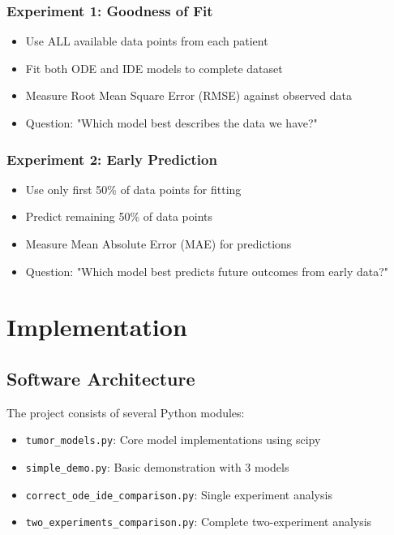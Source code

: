 \documentclass[11pt]{article}
\begin{document}
\subsubsection{Experiment 1: Goodness of Fit}
\begin{itemize}
    \item Use ALL available data points from each patient
    \item Fit both ODE and IDE models to complete dataset
    \item Measure Root Mean Square Error (RMSE) against observed data
    \item Question: "Which model best describes the data we have?"
\end{itemize}

\subsubsection{Experiment 2: Early Prediction}
\begin{itemize}
    \item Use only first 50\% of data points for fitting
    \item Predict remaining 50\% of data points
    \item Measure Mean Absolute Error (MAE) for predictions
    \item Question: "Which model best predicts future outcomes from early data?"
\end{itemize}

\section{Implementation}

\subsection{Software Architecture}

The project consists of several Python modules:

\begin{itemize}
    \item \texttt{tumor\_models.py}: Core model implementations using scipy
    \item \texttt{simple\_demo.py}: Basic demonstration with 3 models
    \item \texttt{correct\_ode\_ide\_comparison.py}: Single experiment analysis
    \item \texttt{two\_experiments\_comparison.py}: Complete two-experiment analysis
\end{itemize}
\end{document}
